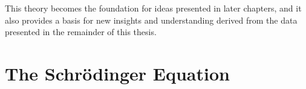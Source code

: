 \documentclass[12pt]{report}
\begin{document}
This theory becomes the foundation for ideas presented in later chapters, and it also provides a basis for new insights and understanding derived from the data presented in the remainder of this thesis.



%
%
%
%
%

\section{The Schr\"{o}dinger Equation}
\end{document}
